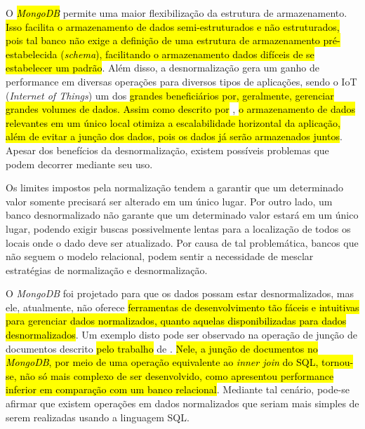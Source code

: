 O \hl{\textit{MongoDB}} permite uma maior flexibilização da estrutura de armazenamento. \hl{Isso facilita o armazenamento de dados semi-estruturados e não estruturados, pois tal banco não exige a definição de uma estrutura de armazenamento pré-estabelecida (\textit{schema}), facilitando o armazenamento dados difíceis de se estabelecer um padrão}. Além disso, a desnormalização gera um ganho de performance em diversas operações para diversos tipos de aplicações, sendo o IoT (\textit{Internet of Things}) um dos \hl{grandes beneficiários por, geralmente, gerenciar grandes volumes de dados. Assim como descrito por} \cite{davoudian2018survey}, \hl{o armazenamento de dados relevantes em um único local otimiza a escalabilidade horizontal da aplicação, além de evitar a junção dos dados, pois os dados já serão armazenados juntos}. Apesar dos benefícios da desnormalização, existem possíveis problemas que podem decorrer mediante seu uso.

Os limites impostos pela normalização tendem a garantir que um determinado valor somente precisará ser alterado em um único lugar. Por outro lado, um banco desnormalizado não garante que um determinado valor estará em um único lugar, podendo exigir buscas possivelmente lentas para a localização de todos os locais onde o dado deve ser atualizado. Por causa de tal problemática, bancos que não seguem o modelo relacional, podem sentir a necessidade de mesclar estratégias de normalização e desnormalização.

O \textit{MongoDB} foi projetado para que os dados possam estar desnormalizados, mas ele, atualmente, não oferece \hl{ferramentas de desenvolvimento tão fáceis e intuitivas para gerenciar dados normalizados, quanto aquelas disponibilizadas para dados desnormalizados}. Um exemplo disto pode ser observado na operação de junção de documentos descrito \hl{pelo trabalho} de . \hl{Nele, a junção de documentos no \textit{MongoDB}, por meio de uma operação equivalente ao \textit{inner join} do SQL, tornou-se, não só mais complexo de ser desenvolvido, como apresentou performance inferior em comparação com um banco relacional}. Mediante tal cenário, pode-se afirmar que existem operações em dados normalizados que seriam mais simples de serem realizadas usando a linguagem SQL.


